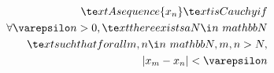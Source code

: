 \documentclass[preview]{standalone}
\begin{document}
\begin{align*}
\te x t{A seque n ce } \{ x _ n \} \te x t{ is Cauchy if } \\\forall \varepsilo n  > 0, \te x t{ there e x ists a }  N  \i n  \ m athbb{ N } \\\te x t{such that for all }  m ,  n  \i n  \ m athbb{ N },  m ,  n  >  N , \\| x _ m  -  x _ n | < \varepsilo n
\end{align*}
\end{document}

